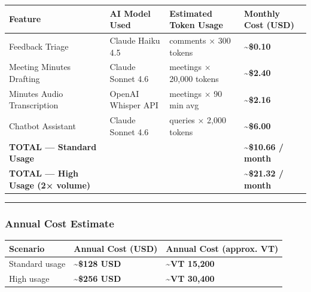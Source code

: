 \documentclass[
]{article}
\newcounter{none} %
\begin{document}
{\def\LTcaptype{none} %
\begin{longtable}[]{@{}
  >{\raggedright\arraybackslash}p{}
  >{\raggedright\arraybackslash}p{}
  >{\raggedright\arraybackslash}p{}
  >{\raggedright\arraybackslash}p{}@{}}
\toprule\noalign{}
\begin{minipage}[b]{\linewidth}\raggedright
Feature
\end{minipage} & \begin{minipage}[b]{\linewidth}\raggedright
AI Model Used
\end{minipage} & \begin{minipage}[b]{\linewidth}\raggedright
Estimated Token Usage
\end{minipage} & \begin{minipage}[b]{\linewidth}\raggedright
Monthly Cost (USD)
\end{minipage} \\
\midrule\noalign{}
\endhead
\bottomrule\noalign{}
\endlastfoot
Feedback Triage & Claude Haiku 4.5 & 50 comments × 300 tokens &
\textbf{\textasciitilde\$0.10} \\
Meeting Minutes Drafting & Claude Sonnet 4.6 & 4 meetings × 20,000
tokens & \textbf{\textasciitilde\$2.40} \\
Minutes Audio Transcription & OpenAI Whisper API & 4 meetings × 90 min
avg & \textbf{\textasciitilde\$2.16} \\
Chatbot Assistant & Claude Sonnet 4.6 & 200 queries × 2,000 tokens &
\textbf{\textasciitilde\$6.00} \\
\textbf{TOTAL --- Standard Usage} & & & \textbf{\textasciitilde\$10.66 /
month} \\
\textbf{TOTAL --- High Usage (2× volume)} & & &
\textbf{\textasciitilde\$21.32 / month} \\
\end{longtable}
}

\begin{center}\rule{0.5\linewidth}{0.5pt}\end{center}

\subsubsection{Annual Cost Estimate}\label{annual-cost-estimate}

{\def\LTcaptype{none} %
\begin{longtable}[]{@{}lll@{}}
\toprule\noalign{}
Scenario & Annual Cost (USD) & Annual Cost (approx. VT) \\
\midrule\noalign{}
\endhead
\bottomrule\noalign{}
\endlastfoot
Standard usage & \textbf{\textasciitilde\$128 USD} &
\textbf{\textasciitilde VT 15,200} \\
High usage & \textbf{\textasciitilde\$256 USD} &
\textbf{\textasciitilde VT 30,400} \\
\end{longtable}
}
\end{document}
